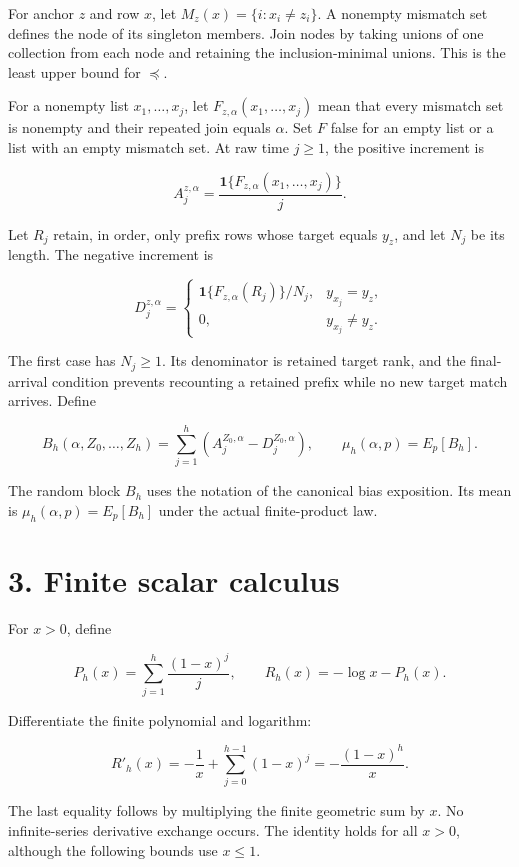 \documentclass[11pt,a4paper]{article}
\newcounter{none}
\begin{document}
For anchor \(z\) and row \(x\), let \(M_z(x)=\{i:x_i\ne z_i\}\). A nonempty mismatch set defines the node of its singleton members. Join nodes by taking unions of one collection from each node and retaining the inclusion-minimal unions. This is the least upper bound for \(\preceq\).

For a nonempty list \(x_1,\ldots,x_j\), let \(F_{z,\alpha}(x_1,\ldots,x_j)\) mean that every mismatch set is nonempty and their repeated join equals \(\alpha\). Set \(F\) false for an empty list or a list with an empty mismatch set. At raw time \(j\ge1\), the positive increment is

\[
A_j^{z,\alpha}=\frac{\mathbf1\{F_{z,\alpha}(x_1,\ldots,x_j)\}}j.
\]

Let \(R_j\) retain, in order, only prefix rows whose target equals \(y_z\), and let \(N_j\) be its length. The negative increment is

\[
D_j^{z,\alpha}=
\begin{cases}
\mathbf1\{F_{z,\alpha}(R_j)\}/N_j,&y_{x_j}=y_z,\\
0,&y_{x_j}\ne y_z.
\end{cases}
\]

The first case has \(N_j\ge1\). Its denominator is retained target rank, and the final-arrival condition prevents recounting a retained prefix while no new target match arrives. Define

\[
B_h(\alpha,Z_0,\ldots,Z_h)=\sum_{j=1}^h(A_j^{Z_0,\alpha}-D_j^{Z_0,\alpha}),
\qquad \mu_h(\alpha,p)=E_p[B_h]. \tag{4}
\]

The random block \(B_h\) uses the notation of the canonical bias exposition. Its mean is \(\mu_h(\alpha,p)=E_p[B_h]\) under the actual finite-product law.

\section{3. Finite scalar calculus}\label{finite-scalar-calculus}

For \(x>0\), define

\[
P_h(x)=\sum_{j=1}^h\frac{(1-x)^j}{j},\qquad
R_h(x)=-\log x-P_h(x).
\]

Differentiate the finite polynomial and logarithm:

\[
R'_h(x)=-\frac1x+\sum_{j=0}^{h-1}(1-x)^j
=-\frac{(1-x)^h}{x}. \tag{5}
\]

The last equality follows by multiplying the finite geometric sum by \(x\). No infinite-series derivative exchange occurs. The identity holds for all \(x>0\), although the following bounds use \(x\le1\).
\end{document}
